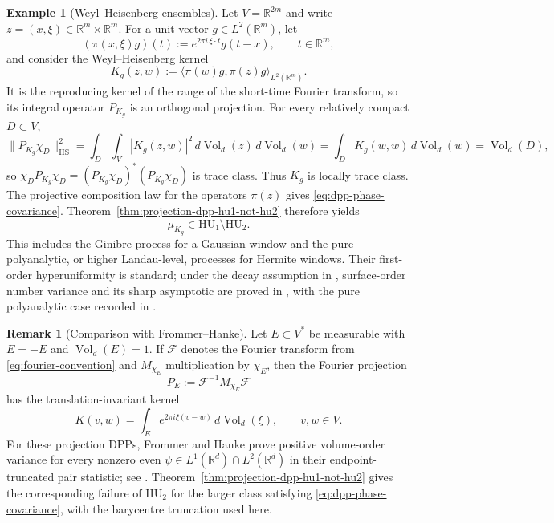 \documentclass[11pt,reqno,a4paper]{amsart}
\numberwithin{equation}{section}
\theoremstyle{compact}
\theoremstyle{definition}
\newtheorem*{example}{Example}
\theoremstyle{definition}
\newtheorem{remark}[theorem]{Remark}
\newcommand{\HU}{\mathrm{HU}}
\newcommand{\Vol}{\operatorname{Vol}}
\begin{document}
\begin{example}[Weyl--Heisenberg ensembles]
Let $V=\mathbb R^{2m}$ and write $z=(x,\xi)\in\mathbb R^m\times\mathbb R^m$.
For a unit vector $g\in L^2(\mathbb R^m)$, let
\begin{equation}\label{eq:wh-time-frequency-shift}
  (\pi(x,\xi)g)(t):=e^{2\pi i\,\xi\cdot t}g(t-x),
  \qquad t\in\mathbb R^m,
\end{equation}
and consider the Weyl--Heisenberg kernel
\begin{equation}\label{eq:wh-kernel}
  K_g(z,w):=\langle \pi(w)g,\pi(z)g\rangle_{L^2(\mathbb R^m)}.
\end{equation}
It is the reproducing kernel of the range of the short-time Fourier transform,
so its integral operator $P_{K_g}$ is an orthogonal projection.  For every
relatively compact $D\subset V$,
\[
  \|P_{K_g}\chi_D\|_{\mathrm{HS}}^2
  =\int_D\int_V |K_g(z,w)|^2\,d\Vol_d(z)\,d\Vol_d(w)
  =\int_D K_g(w,w)\,d\Vol_d(w)
  =\Vol_d(D),
\]
so $\chi_D P_{K_g}\chi_D=(P_{K_g}\chi_D)^*(P_{K_g}\chi_D)$ is trace
class.  Thus $K_g$ is locally trace class.  The projective composition law for
the operators $\pi(z)$ gives \eqref{eq:dpp-phase-covariance}.
Theorem~\ref{thm:projection-dpp-hu1-not-hu2} therefore yields
\begin{equation}\label{eq:wh-hierarchy-separation}
  \mu_{K_g}\in\HU_1\setminus\HU_2.
\end{equation}
This includes the Ginibre process for a Gaussian window and the pure
polyanalytic, or higher Landau-level, processes for Hermite windows.  Their
first-order hyperuniformity is standard; under the decay assumption in
\cite[Definition~5.1]{APRT17}, surface-order number variance and its sharp
asymptotic are proved in \cite[Theorems~5.6 and~5.8]{APRT17}, with the pure
polyanalytic case recorded in \cite[Corollary~5.11]{APRT17}.
\end{example}

\begin{remark}[Comparison with Frommer--Hanke]
Let $E\subset V^*$ be measurable with $E=-E$ and $\Vol_d(E)=1$.  If
$\mathcal F$ denotes the Fourier transform from
\eqref{eq:fourier-convention} and $M_{\chi_E}$ multiplication by $\chi_E$,
then the Fourier projection
\begin{equation}\label{eq:fourier-projection}
  P_E:=\mathcal F^{-1}M_{\chi_E}\mathcal F
\end{equation}
has the translation-invariant kernel
\begin{equation}\label{eq:fourier-projection-kernel}
  K(v,w)
  =\int_E e^{2\pi i\xi(v-w)}\,d\Vol_d(\xi),
  \qquad v,w\in V.
\end{equation}
For these projection DPPs, Frommer and Hanke prove positive volume-order
variance for every nonzero even
$\psi\in L^1(\mathbb R^d)\cap L^2(\mathbb R^d)$ in their endpoint-truncated pair
statistic; see \cite[Theorem~4.2]{FH26}.  Theorem~\ref{thm:projection-dpp-hu1-not-hu2}
gives the corresponding failure of $\HU_2$ for the larger class satisfying
\eqref{eq:dpp-phase-covariance}, with the barycentre truncation used here.
\end{remark}
\end{document}
